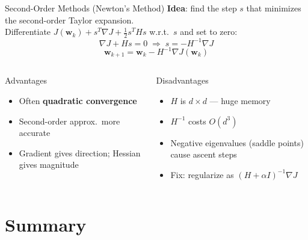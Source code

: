 \documentclass{beamer}
\begin{document}
\begin{frame}{Second-Order Methods (Newton's Method)}
  \textbf{Idea}: find the step $s$ that minimizes the second-order Taylor expansion.\\[4pt]
  Differentiate $J(\mathbf{w}_k) + s^T\nabla J + \frac{1}{2}s^T H s$ w.r.t.\ $s$ and set to zero:
  \[
    \nabla J + H s = 0 \;\Longrightarrow\; s = -H^{-1}\nabla J
  \]
  \[
    \boxed{\mathbf{w}_{k+1} = \mathbf{w}_k - H^{-1}\nabla J(\mathbf{w}_k)}
  \]
  \vspace{0.1cm}
  \begin{columns}
    \begin{exampleblock}{Advantages}
      \begin{itemize}
        \item Often \textbf{quadratic convergence}
        \item Second-order approx.\ more accurate
        \item Gradient gives direction; Hessian gives magnitude
      \end{itemize}
    \end{exampleblock}
    \begin{alertblock}{Disadvantages}
      \begin{itemize}
        \item $H$ is $d\times d$ --- huge memory
        \item $H^{-1}$ costs $O(d^3)$
        \item Negative eigenvalues (saddle points) cause ascent steps
        \item Fix: regularize as $(H+\alpha I)^{-1}\nabla J$
      \end{itemize}
    \end{alertblock}
  \end{columns}
\end{frame}

\section{Summary}
\end{document}
